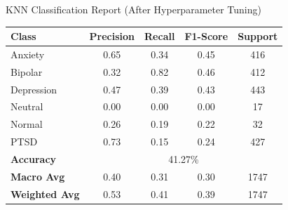 \begin{center}
\vspace{1.5in}

\pagebreak
\caption{KNN Classification Report (After Hyperparameter Tuning)}
\begin{tabular}{|l|c|c|c|c|}
\hline
\textbf{Class} & \textbf{Precision} & \textbf{Recall} & \textbf{F1-Score} & \textbf{Support} \\ \hline
Anxiety        & 0.65               & 0.34            & 0.45              & 416              \\ \hline
Bipolar        & 0.32               & 0.82            & 0.46              & 412              \\ \hline
Depression     & 0.47               & 0.39            & 0.43              & 443              \\ \hline
Neutral        & 0.00               & 0.00            & 0.00              & 17               \\ \hline
Normal         & 0.26               & 0.19            & 0.22              & 32               \\ \hline
PTSD           & 0.73               & 0.15            & 0.24              & 427              \\ \hline
\textbf{Accuracy} & \multicolumn{4}{|c|}{41.27\%} \\ \hline
\textbf{Macro Avg} & 0.40            & 0.31            & 0.30              & 1747             \\ \hline
\textbf{Weighted Avg} & 0.53         & 0.41            & 0.39              & 1747             \\ \hline
\end{tabular}


\vspace{0.25in}


\end{center}

